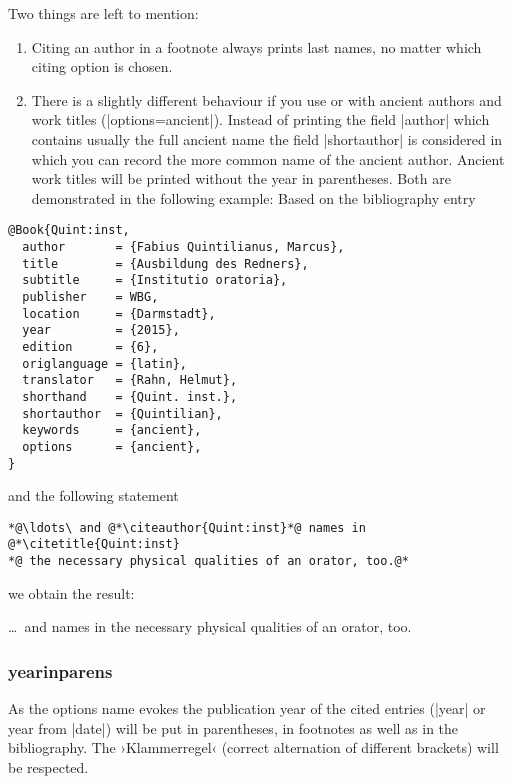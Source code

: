 \documentclass[a4paper,
10pt,
greek,
french,
spanish,
italian,
ngerman,
english
]{ltxdoc}
\begin{document}
Two things are left to mention: 
\begin{enumerate}
\item Citing an author in a footnote always prints  last names, no matter which citing option is chosen. 
\item There is a slightly different behaviour if you use   or   with ancient authors and work titles (|options={ancient}|).
Instead of printing the field |author| which contains usually the full ancient name the field |shortauthor| is considered in which you can record the more common name of the ancient author.
Ancient work titles will be printed without the year in parentheses. 
Both are demonstrated in the following example: Based on the bibliography entry
\end{enumerate}
\begin{lstlisting}[style=bibentry,label=Quint:inst,caption={{@}Book\{Quint:inst,…\} }]
@Book{Quint:inst,
  author       = {Fabius Quintilianus, Marcus},
  title        = {Ausbildung des Redners},
  subtitle     = {Institutio oratoria},
  publisher    = WBG,
  location     = {Darmstadt},
  year         = {2015},
  edition      = {6},
  origlanguage = {latin},
  translator   = {Rahn, Helmut},
  shorthand    = {Quint. inst.},
  shortauthor  = {Quintilian},
  keywords     = {ancient},
  options      = {ancient},
}
\end{lstlisting}

and the following statement

\begin{refsection}
\begin{lstlisting}
*@\ldots\ and @*\citeauthor{Quint:inst}*@ names in @*\citetitle{Quint:inst} 
*@ the necessary physical qualities of an orator, too.@*
\end{lstlisting}
 
we obtain the result:

\begin{bsp}
\ldots\ and \citeauthor{Quint:inst} names in  the  necessary physical qualities of an orator, too.
\end{bsp}
\end{refsection}


\subsubsection{yearinparens}\label{yearinparens}
%
As the options name evokes the publication year of the cited entries 
(|year| or year from |date|) will be put in parentheses,
in footnotes as well as in the bibliography. 
The ›Klammerregel‹ (correct alternation of different brackets) will be respected.
\end{document}

